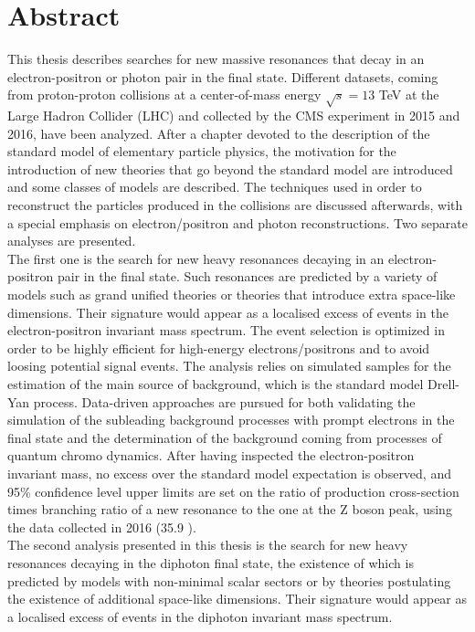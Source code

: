 \section*{Abstract}
This thesis describes searches for new massive resonances that decay in an electron-positron or photon pair in the final state.
Different datasets, coming from proton-proton collisions at a center-of-mass energy $\sqrt{s}=13$ TeV at the Large Hadron Collider (LHC) and collected by the CMS experiment in 2015 and 2016, have been analyzed.
After a chapter devoted to the description of the standard model of elementary particle physics, the motivation for the introduction of new theories that go beyond the standard model are introduced and some classes of models are described.
The techniques used in order to reconstruct the particles produced in the collisions are discussed afterwards, with a special emphasis on electron/positron and
photon reconstructions. Two separate analyses are presented.
\\The first one is the search for new heavy resonances decaying in an electron-positron pair in the final state.
Such resonances are predicted by a variety of models such as grand unified theories or theories that introduce extra space-like dimensions. Their signature would appear as
a localised excess of events in the electron-positron invariant mass spectrum.
The event selection is optimized in order to be highly efficient for high-energy electrons/positrons and to avoid loosing potential signal events.
The analysis relies on simulated samples for the estimation of the main source of background, which is the standard model Drell-Yan process.
Data-driven approaches are pursued for both validating the simulation of the
subleading background processes with prompt electrons in the final state and the determination of the background coming from processes of quantum chromo dynamics.
After having inspected the electron-positron invariant mass, no excess over the standard model
expectation is observed, and 95\% confidence
level upper limits are set on the ratio of production cross-section times branching ratio of a
new resonance to the one at the Z boson peak, using the data collected in 2016 (35.9 \fbinv).
\\The second analysis presented in this thesis is the search for new heavy resonances decaying in the diphoton final state, the existence of which is predicted by models with non-minimal scalar sectors or by theories postulating the existence of additional space-like dimensions.
Their signature would appear as a localised excess of events in the diphoton invariant mass spectrum.
